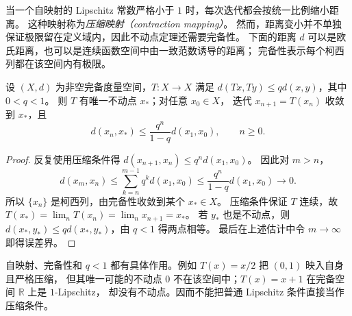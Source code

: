 \documentclass[UTF8,12pt,a4paper,fontset=fandol]{ctexart}
\begin{document}
当一个自映射的 Lipschitz 常数严格小于 $1$ 时，每次迭代都会按统一比例缩小距离。
这种映射称为\emph{压缩映射（contraction mapping）}。
然而，距离变小并不单独保证极限留在定义域内，因此不动点定理还需要完备性。
下面的距离 $d$ 可以是欧氏距离，也可以是连续函数空间中由一致范数诱导的距离；
完备性表示每个柯西列都在该空间内有极限。

\begin{theorem}[巴拿赫不动点定理]\label{thm:lip-banach}
设 $(X,d)$ 为非空完备度量空间，$T:X\to X$ 满足
$d(Tx,Ty)\le qd(x,y)$，其中 $0<q<1$。
则 $T$ 有唯一不动点 $x_*$；对任意 $x_0\in X$，
迭代 $x_{n+1}=T(x_n)$ 收敛到 $x_*$，且
\begin{equation}\label{eq:lip-contraction-error}
  d(x_n,x_*)\le\frac{q^n}{1-q}d(x_1,x_0),\qquad n\ge0.
\end{equation}
\end{theorem}
\begin{proof}
反复使用压缩条件得 $d(x_{n+1},x_n)\le q^n d(x_1,x_0)$。
因此对 $m>n$，
\[
  d(x_m,x_n)\le\sum_{k=n}^{m-1}q^k d(x_1,x_0)
  \le\frac{q^n}{1-q}d(x_1,x_0)\longrightarrow0.
\]
所以 $\{x_n\}$ 是柯西列，由完备性收敛到某个 $x_*\in X$。
压缩条件保证 $T$ 连续，故 $T(x_*)=\lim_nT(x_n)=\lim_nx_{n+1}=x_*$。
若 $y_*$ 也是不动点，则 $d(x_*,y_*)\le qd(x_*,y_*)$，由 $q<1$ 得两点相等。
最后在上述估计中令 $m\to\infty$ 即得误差界。
\end{proof}

自映射、完备性和 $q<1$ 都有具体作用。例如 $T(x)=x/2$ 把 $(0,1)$ 映入自身且严格压缩，
但其唯一可能的不动点 $0$ 不在该空间中；$T(x)=x+1$ 在完备空间 $\mathbb R$ 上是 $1$-Lipschitz，
却没有不动点。因而不能把普通 Lipschitz 条件直接当作压缩条件。
\end{document}
